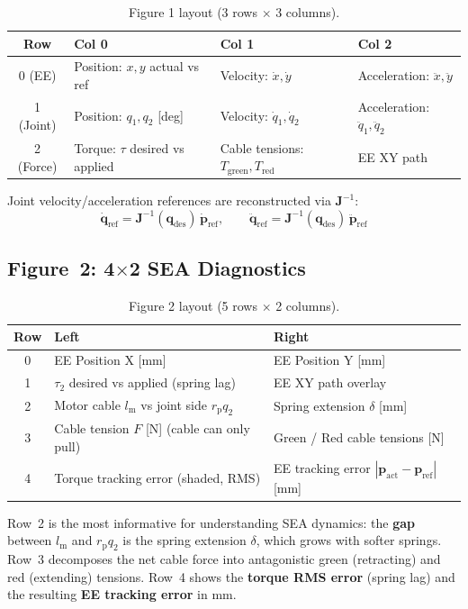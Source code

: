 \documentclass[11pt,a4paper]{article}
\newcommand{\rp}{r_{\mathrm{p}}}
\newcommand{\bq}{\bm{q}}
\newcommand{\bJ}{\bm{J}}
\newcommand{\lm}{l_{\mathrm{m}}}
\begin{document}
\begin{table}[H]
\centering
\caption{Figure 1 layout (3 rows $\times$ 3 columns).}
\begin{tabular}{clll}
\toprule
\textbf{Row} & \textbf{Col 0} & \textbf{Col 1} & \textbf{Col 2} \\
\midrule
0 (EE)     & Position: $x, y$ actual vs ref & Velocity: $\dot{x}, \dot{y}$ & Acceleration: $\ddot{x}, \ddot{y}$ \\
1 (Joint)  & Position: $q_1, q_2$ [deg]     & Velocity: $\dot{q}_1, \dot{q}_2$ & Acceleration: $\ddot{q}_1, \ddot{q}_2$ \\
2 (Force)  & Torque: $\tau$ desired vs applied & Cable tensions: $T_{\mathrm{green}}, T_{\mathrm{red}}$ & EE XY path \\
\bottomrule
\end{tabular}
\end{table}

Joint velocity/acceleration references are reconstructed via $\bJ^{-1}$:
\[
    \dot{\bq}_{\mathrm{ref}} = \bJ^{-1}(\bq_{\mathrm{des}})\,\dot{\bm{p}}_{\mathrm{ref}}, \qquad
    \ddot{\bq}_{\mathrm{ref}} = \bJ^{-1}(\bq_{\mathrm{des}})\,\ddot{\bm{p}}_{\mathrm{ref}}
\]


\subsection{Figure~2: 4$\times$2 SEA Diagnostics}

\begin{table}[H]
\centering
\caption{Figure 2 layout (5 rows $\times$ 2 columns).}
\begin{tabular}{cll}
\toprule
\textbf{Row} & \textbf{Left} & \textbf{Right} \\
\midrule
0 & EE Position X [mm]  & EE Position Y [mm] \\
1 & $\tau_2$ desired vs applied (spring lag) & EE XY path overlay \\
2 & Motor cable $\lm$ vs joint side $\rp q_2$ & Spring extension $\delta$ [mm] \\
3 & Cable tension $F$ [N] (cable can only pull) & Green / Red cable tensions [N] \\
4 & Torque tracking error (shaded, RMS) & EE tracking error $|\bm{p}_{\mathrm{act}} - \bm{p}_{\mathrm{ref}}|$ [mm] \\
\bottomrule
\end{tabular}
\end{table}

Row~2 is the most informative for understanding SEA dynamics: the \textbf{gap} between $\lm$ and $\rp q_2$ is the spring extension $\delta$, which grows with softer springs.  Row~3 decomposes the net cable force into antagonistic green (retracting) and red (extending) tensions.  Row~4 shows the \textbf{torque RMS error} (spring lag) and the resulting \textbf{EE tracking error} in mm.
\end{document}
